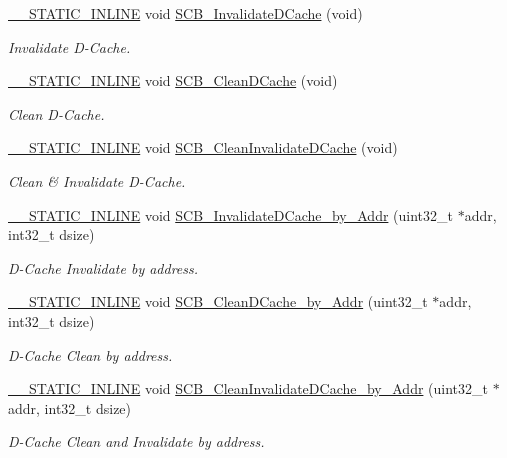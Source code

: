 \begin{DoxyCompactItemize}
\hyperlink{cmsis__iccarm_8h_aba87361bfad2ae52cfe2f40c1a1dbf9c}{\+\_\+\+\_\+\+S\+T\+A\+T\+I\+C\+\_\+\+I\+N\+L\+I\+NE} void \hyperlink{group___c_m_s_i_s___core___cache_functions_gace2d30db08887d0bdb818b8a785a5ce6}{S\+C\+B\+\_\+\+Invalidate\+D\+Cache} (void)
\begin{DoxyCompactList}\small\item\em Invalidate D-\/\+Cache. \end{DoxyCompactList}\item 
\hyperlink{cmsis__iccarm_8h_aba87361bfad2ae52cfe2f40c1a1dbf9c}{\+\_\+\+\_\+\+S\+T\+A\+T\+I\+C\+\_\+\+I\+N\+L\+I\+NE} void \hyperlink{group___c_m_s_i_s___core___cache_functions_ga55583e3065c6eabca204b8b89b121c4c}{S\+C\+B\+\_\+\+Clean\+D\+Cache} (void)
\begin{DoxyCompactList}\small\item\em Clean D-\/\+Cache. \end{DoxyCompactList}\item 
\hyperlink{cmsis__iccarm_8h_aba87361bfad2ae52cfe2f40c1a1dbf9c}{\+\_\+\+\_\+\+S\+T\+A\+T\+I\+C\+\_\+\+I\+N\+L\+I\+NE} void \hyperlink{group___c_m_s_i_s___core___cache_functions_ga1b741def9e3b2ca97dc9ea49b8ce505c}{S\+C\+B\+\_\+\+Clean\+Invalidate\+D\+Cache} (void)
\begin{DoxyCompactList}\small\item\em Clean \& Invalidate D-\/\+Cache. \end{DoxyCompactList}\item 
\hyperlink{cmsis__iccarm_8h_aba87361bfad2ae52cfe2f40c1a1dbf9c}{\+\_\+\+\_\+\+S\+T\+A\+T\+I\+C\+\_\+\+I\+N\+L\+I\+NE} void \hyperlink{group___c_m_s_i_s___core___cache_functions_ga503ef7ef58c0773defd15a82f6336c09}{S\+C\+B\+\_\+\+Invalidate\+D\+Cache\+\_\+by\+\_\+\+Addr} (uint32\+\_\+t $\ast$addr, int32\+\_\+t dsize)
\begin{DoxyCompactList}\small\item\em D-\/\+Cache Invalidate by address. \end{DoxyCompactList}\item 
\hyperlink{cmsis__iccarm_8h_aba87361bfad2ae52cfe2f40c1a1dbf9c}{\+\_\+\+\_\+\+S\+T\+A\+T\+I\+C\+\_\+\+I\+N\+L\+I\+NE} void \hyperlink{group___c_m_s_i_s___core___cache_functions_ga696fadbf7b9cc71dad42fab61873a40d}{S\+C\+B\+\_\+\+Clean\+D\+Cache\+\_\+by\+\_\+\+Addr} (uint32\+\_\+t $\ast$addr, int32\+\_\+t dsize)
\begin{DoxyCompactList}\small\item\em D-\/\+Cache Clean by address. \end{DoxyCompactList}\item 
\hyperlink{cmsis__iccarm_8h_aba87361bfad2ae52cfe2f40c1a1dbf9c}{\+\_\+\+\_\+\+S\+T\+A\+T\+I\+C\+\_\+\+I\+N\+L\+I\+NE} void \hyperlink{group___c_m_s_i_s___core___cache_functions_ga630131b2572eaa16b569ed364dfc895e}{S\+C\+B\+\_\+\+Clean\+Invalidate\+D\+Cache\+\_\+by\+\_\+\+Addr} (uint32\+\_\+t $\ast$addr, int32\+\_\+t dsize)
\begin{DoxyCompactList}\small\item\em D-\/\+Cache Clean and Invalidate by address. \end{DoxyCompactList}\end{DoxyCompactItemize}



